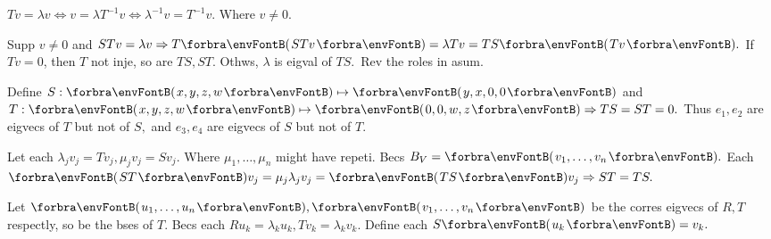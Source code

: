 $Tv=\lambda v\Longleftrightarrow v=\lambda T^{-1}v\Longleftrightarrow \lambda^{-1}v=T^{-1}v.$ Where $v\neq 0.$\PfEnd
\SepLine


\! Supp $v\neq 0$ and $STv=\lambda v\Rightarrow T\Par{STv}=\lambda Tv=TS\Par{Tv}.$\parSol{}
If $Tv=0$, then $T$ not inje, so are $TS,ST.$ Othws, $\lambda$ is eigval of $TS.$ \,Rev the roles in asum.\PfEnd
\SepLine

Define $S:\Par{x,y,z,w}\mapsto\Par{y,x,0,0}$ and $T:\Par{x,y,z,w}\mapsto\Par{0,0,w,z}\Rightarrow TS=ST=0.$\parSol{}
Thus ${e_1,e_2}$ are eigvecs of $T$ but not of $S,$ and ${e_3,e_4}$ are eigvecs of $S$ but not of $T.$
\SepLine\pagebreak

Let each $\lambda_jv_j=Tv_j,\mu_jv_j=Sv_j.$ Where $\mu_1,\dots,\mu_n$ might have repeti.\parSol{}
Becs $B_V=\Par{v_1,\dots,v_n}.$ Each $\Par{ST}v_j=\mu_j\lambda_j v_j=\Par{TS}v_j\Rightarrow ST=TS.$\PfEnd
\SepLine

Let $\Par{u_1,\dots,u_n},\Par{v_1,\dots,v_n}$ be the corres eigvecs of $R,T$ respectly, so be the bses of $T$.\parSol{}
Becs each $Ru_k=\lambda_ku_k,Tv_k=\lambda_kv_k.$ Define each $S\Par{u_k}=v_k.$\PfEnd
\SepLine

